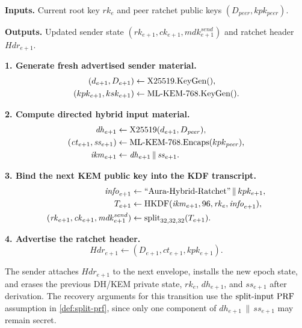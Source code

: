 \documentclass[preprint,12pt]{elsarticle}
\theoremstyle{definition}
\newcommand{\tech}[1]{\textnormal{#1}}
\newcommand{\domain}[1]{\textnormal{``#1''}}
\newcommand{\HKDF}{\tech{HKDF}}
\renewcommand{\DH}{\tech{X25519}}
\newcommand{\KEM}{\tech{ML-KEM-768}}
\newcommand{\KeyGen}{\tech{KeyGen}}
\newcommand{\Encaps}{\tech{Encaps}}
\newcommand{\splitInputPRF}{\tech{split-input PRF}}
\newcommand{\concat}{\,\|\,}
\newcommand{\rk}{\mathit{rk}}
\newcommand{\ck}{\mathit{ck}}
\newcommand{\mdk}{\mathit{mdk}}
\begin{document}
\begingroup
\LinesNotNumbered
\SetAlgoNoLine
\begin{algorithm}[H]
\caption{Send-side hybrid ratchet transition (epoch $e \to e+1$).}\label{alg:send-ratchet}
\footnotesize
\textbf{Inputs.}
Current root key $\rk_e$ and peer ratchet public keys
$(D_{\mathit{peer}},kpk_{\mathit{peer}})$.

\textbf{Outputs.}
Updated sender state $(\rk_{e+1},\ck_{e+1},\mdk_{e+1}^{\mathit{send}})$ and
ratchet header $\mathit{Hdr}_{e+1}$.
\vspace{0.25\baselineskip}

\textbf{1. Generate fresh advertised sender material.}
\[
\begin{aligned}
(d_{e+1},D_{e+1}) &\gets \tech{X25519.KeyGen}(),\\
(kpk_{e+1},ksk_{e+1}) &\gets \KEM.\KeyGen().
\end{aligned}
\]

\textbf{2. Compute directed hybrid input material.}
\[
\begin{aligned}
\mathit{dh}_{e+1} &\gets \DH(d_{e+1},D_{\mathit{peer}}),\\
(\mathit{ct}_{e+1},\mathit{ss}_{e+1}) &\gets
  \KEM.\Encaps(kpk_{\mathit{peer}}),\\
\mathit{ikm}_{e+1} &\gets
  \mathit{dh}_{e+1}\concat\mathit{ss}_{e+1}.
\end{aligned}
\]

\textbf{3. Bind the next KEM public key into the KDF transcript.}
\[
\begin{aligned}
\mathit{info}_{e+1} &\gets
  \domain{Aura-Hybrid-Ratchet}\concat kpk_{e+1},\\
T_{e+1} &\gets
  \HKDF(\mathit{ikm}_{e+1},96,\rk_e,\mathit{info}_{e+1}),\\
(\rk_{e+1},\ck_{e+1},\mdk_{e+1}^{\mathit{send}}) &\gets
  \operatorname{split}_{32,32,32}(T_{e+1}).
\end{aligned}
\]

\textbf{4. Advertise the ratchet header.}
\[
\mathit{Hdr}_{e+1}\gets(D_{e+1},\mathit{ct}_{e+1},kpk_{e+1}).
\]
\end{algorithm}
\endgroup

The sender attaches $\mathit{Hdr}_{e+1}$ to the next envelope, installs the
new epoch state, and erases the previous DH/KEM private state, $\rk_e$,
$\mathit{dh}_{e+1}$, and $\mathit{ss}_{e+1}$ after derivation.
The recovery arguments for this transition use the $\splitInputPRF$
assumption in \cref{def:split-prf}, since only one component of
$\mathit{dh}_{e+1}\concat\mathit{ss}_{e+1}$ may remain secret.
\end{document}
